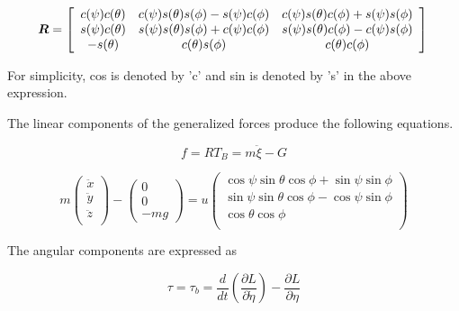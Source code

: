 \begin{equation}
\boldsymbol R = \left[ \begin{array}{ccc}
c(\psi) c(\theta) & c(\psi) s(\theta) s(\phi) - s(\psi) c(\phi) & c(\psi) s(\theta) c(\phi) + s(\psi) s(\phi)\\
s(\psi) c(\theta) & s(\psi) s(\theta) s(\phi) + c(\psi) c(\phi) & s(\psi) s(\theta) c(\phi) - c(\psi) s(\phi)\\
-s(\theta) & c(\theta) s(\phi) & c(\theta) c(\phi)\\
\end{array} \right]\\
\end{equation}

For simplicity, cos is denoted by 'c' and sin is denoted by 's' in the above expression.





\noindent The linear components of the generalized forces produce the following equations.

\begin{equation}
    \label{linforce}
    f =  R  T_B = m \ddot{ \xi} -  G
\end{equation}


\begin{equation}
    m\left(\begin{array}{c}
      \ddot{x}\\
      \ddot{y}\\
      \ddot{z}\\
    \end{array}\right)
    - \left( \begin{array}{c}
        0\\
        0\\
        -m g
      \end{array} \right)
      =u
     \left(
    \begin{array}{c}
     \cos{\psi}\sin{\theta}\cos{\phi} + \sin{\psi}\sin{\phi} \\
     \sin{\psi}\sin{\theta}\cos{\phi} - \cos{\psi}\sin{\phi} \\
     \cos{\theta} \cos{\phi} \\
    \end{array}
    \right)
\end{equation}


\noindent The angular components are expressed as

\begin{equation}
    \tau = \tau_b =\frac{d}{dt} \left( \frac{\partial  L} {\partial \dot{\eta}}\right) - \frac{\partial  L}{\partial \eta}
\end{equation}

